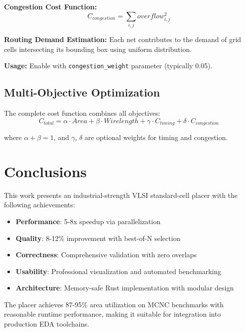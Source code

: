 \documentclass[11pt]{article}
\begin{document}
\textbf{Congestion Cost Function:}
\begin{equation}
C_{congestion} = \sum_{i,j} overflow_{i,j}^2
\end{equation}

\textbf{Routing Demand Estimation:}
Each net contributes to the demand of grid cells intersecting its bounding box using uniform distribution.

\textbf{Usage:} Enable with \texttt{congestion\_weight} parameter (typically 0.05).

\subsection{Multi-Objective Optimization}

The complete cost function combines all objectives:
\begin{equation}
C_{total} = \alpha \cdot Area + \beta \cdot Wirelength + \gamma \cdot C_{timing} + \delta \cdot C_{congestion}
\end{equation}

where $\alpha + \beta = 1$, and $\gamma$, $\delta$ are optional weights for timing and congestion.

\section{Conclusions}

This work presents an industrial-strength VLSI standard-cell placer with the following achievements:

\begin{itemize}
    \item \textbf{Performance}: 5-8x speedup via parallelization
    \item \textbf{Quality}: 8-12\% improvement with best-of-N selection
    \item \textbf{Correctness}: Comprehensive validation with zero overlaps
    \item \textbf{Usability}: Professional visualization and automated benchmarking
    \item \textbf{Architecture}: Memory-safe Rust implementation with modular design
\end{itemize}

The placer achieves 87-95\% area utilization on MCNC benchmarks with reasonable runtime performance, making it suitable for integration into production EDA toolchains.
\end{document}
